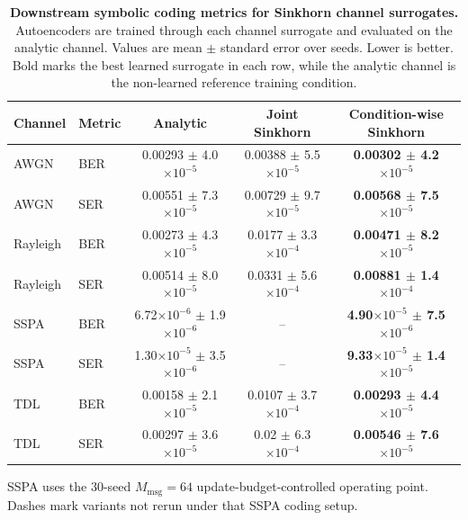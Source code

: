 \begin{table}[t]
\centering
\caption{\textbf{Downstream symbolic coding metrics for Sinkhorn channel surrogates.} Autoencoders are trained through each channel surrogate and evaluated on the analytic channel. Values are mean $\pm$ standard error over seeds. Lower is better. Bold marks the best learned surrogate in each row, while the analytic channel is the non-learned reference training condition.}
\label{tab:wflow-ser-ber}
\tablefontsize
\begin{tabular}{@{}llccc@{}}
\toprule
Channel & Metric & Analytic & Joint Sinkhorn & Condition-wise Sinkhorn \\
\midrule
AWGN & BER & 0.00293 $\pm$ 4.0$\times 10^{-5}$ & 0.00388 $\pm$ 5.5$\times 10^{-5}$ & \textbf{0.00302 $\pm$ 4.2$\times 10^{-5}$} \\
AWGN & SER & 0.00551 $\pm$ 7.3$\times 10^{-5}$ & 0.00729 $\pm$ 9.7$\times 10^{-5}$ & \textbf{0.00568 $\pm$ 7.5$\times 10^{-5}$} \\
\midrule
Rayleigh & BER & 0.00273 $\pm$ 4.3$\times 10^{-5}$ & 0.0177 $\pm$ 3.3$\times 10^{-4}$ & \textbf{0.00471 $\pm$ 8.2$\times 10^{-5}$} \\
Rayleigh & SER & 0.00514 $\pm$ 8.0$\times 10^{-5}$ & 0.0331 $\pm$ 5.6$\times 10^{-4}$ & \textbf{0.00881 $\pm$ 1.4$\times 10^{-4}$} \\
\midrule
SSPA & BER & 6.72$\times 10^{-6}$ $\pm$ 1.9$\times 10^{-6}$ & -- & \textbf{4.90$\times 10^{-5}$ $\pm$ 7.5$\times 10^{-6}$} \\
SSPA & SER & 1.30$\times 10^{-5}$ $\pm$ 3.5$\times 10^{-6}$ & -- & \textbf{9.33$\times 10^{-5}$ $\pm$ 1.4$\times 10^{-5}$} \\
\midrule
TDL & BER & 0.00158 $\pm$ 2.1$\times 10^{-5}$ & 0.0107 $\pm$ 3.7$\times 10^{-4}$ & \textbf{0.00293 $\pm$ 4.4$\times 10^{-5}$} \\
TDL & SER & 0.00297 $\pm$ 3.6$\times 10^{-5}$ & 0.02 $\pm$ 6.3$\times 10^{-4}$ & \textbf{0.00546 $\pm$ 7.6$\times 10^{-5}$} \\
\bottomrule
\end{tabular}
\par\vspace{0.25em}
\begin{minipage}{0.92\textwidth}
\footnotesize\raggedright
SSPA uses the \(30\)-seed \(M_{\mathrm{msg}}=64\) update-budget-controlled operating point. Dashes mark variants not rerun under that SSPA coding setup.
\end{minipage}
\end{table}
